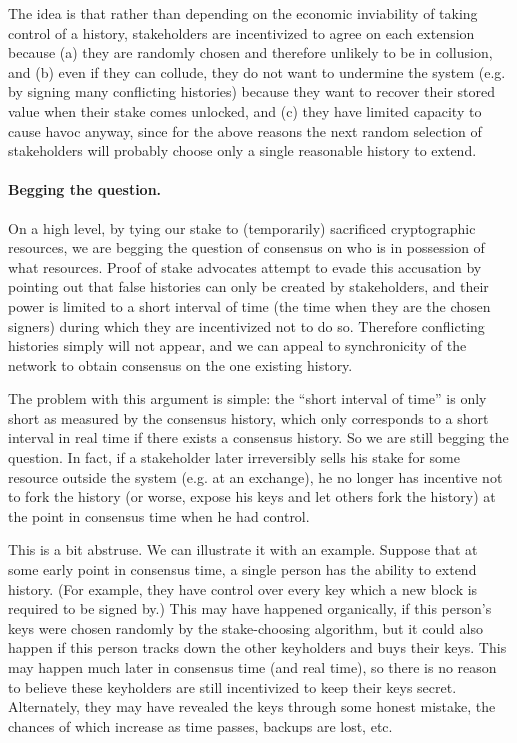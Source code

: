 \documentclass[letterpaper]{article}
\begin{document}
The idea is that rather than depending on the economic inviability of taking control of
a history, stakeholders are incentivized to agree on each extension because (a) they are
randomly chosen and therefore unlikely to be in collusion, and (b) even if they can
collude, they do not want to undermine the system (e.g. by signing many conflicting
histories) because they want to recover their stored value when their stake comes unlocked,
and (c) they have limited capacity to cause havoc anyway, since for the above reasons the
next random selection of stakeholders will probably choose only a single reasonable
history to extend.

\paragraph{Begging the question.}
On a high level, by tying our stake to (temporarily) sacrificed cryptographic resources,
we are begging the question of consensus on who is in possession of what resources.
Proof of stake advocates attempt to evade this accusation by pointing out that false
histories can only be created by stakeholders, and their power is limited to a short
interval of time (the time when they are the chosen signers) during which they are incentivized
not to do so. Therefore conflicting histories simply will not appear, and we can appeal to
synchronicity of the network to obtain consensus on the one existing history.

The problem with this argument is simple: the ``short interval of time'' is only
short as measured by the consensus history, which only corresponds to a short interval
in real time if there exists a consensus history. So we are still begging the question.
In fact, if a stakeholder later irreversibly sells his stake for some resource outside
the system (e.g. at an exchange), he no longer has incentive not to fork the history
(or worse, expose his keys and let others fork the history) at the point in consensus
time when he had control.

This is a bit abstruse. We can illustrate it with an example. Suppose that at some
early point in consensus time, a single person has the ability to extend history.
(For example, they have control over every key which a new block is required to be
signed by.) This may have happened organically, if this person's keys were chosen
randomly by the stake-choosing algorithm, but it could also happen if this person
tracks down the other keyholders and buys their keys. This may happen much later in
consensus time (and real time), so there is no reason to believe these keyholders
are still incentivized to keep their keys secret. Alternately, they may have revealed
the keys through some honest mistake, the chances of which increase as time passes,
backups are lost, etc.
\end{document}
